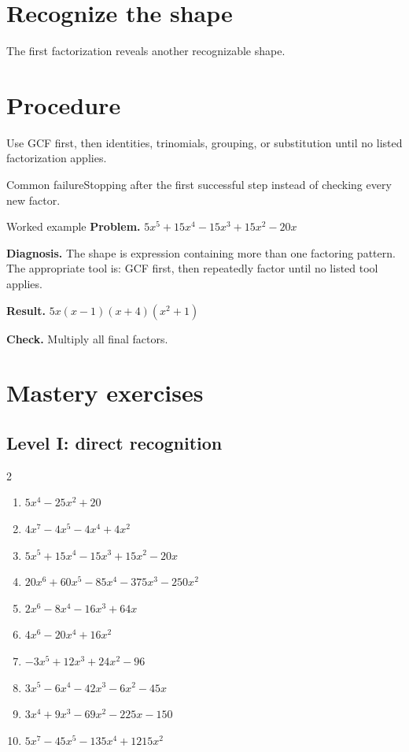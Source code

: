\documentclass[11pt,oneside]{book}
\begin{document}
\section{Recognize the shape}
The first factorization reveals another recognizable shape.
\section{Procedure}
Use GCF first, then identities, trinomials, grouping, or substitution until no listed factorization applies.

\begin{warningbox}{Common failure}Stopping after the first successful step instead of checking every new factor.\end{warningbox}
\begin{examplebox}{Worked example}
\textbf{Problem.} $ 5 x^{5} + 15 x^{4} - 15 x^{3} + 15 x^{2} - 20 x $

\textbf{Diagnosis.} The shape is expression containing more than one factoring pattern. The appropriate tool is: GCF first, then repeatedly factor until no listed tool applies.

\textbf{Result.} $ 5 x \left(x - 1\right) \left(x + 4\right) \left(x^{2} + 1\right) $

\textbf{Check.} Multiply all final factors.
\end{examplebox}
\section{Mastery exercises}
\subsection*{Level I: direct recognition}
\begin{multicols}{2}
\begin{enumerate}[leftmargin=*,label=\textbf{\arabic*.},itemsep=0.65\baselineskip]
\item $ 5 x^{4} - 25 x^{2} + 20 $
\item $ 4 x^{7} - 4 x^{5} - 4 x^{4} + 4 x^{2} $
\item $ 5 x^{5} + 15 x^{4} - 15 x^{3} + 15 x^{2} - 20 x $
\item $ 20 x^{6} + 60 x^{5} - 85 x^{4} - 375 x^{3} - 250 x^{2} $
\item $ 2 x^{6} - 8 x^{4} - 16 x^{3} + 64 x $
\item $ 4 x^{6} - 20 x^{4} + 16 x^{2} $
\item $ - 3 x^{5} + 12 x^{3} + 24 x^{2} - 96 $
\item $ 3 x^{5} - 6 x^{4} - 42 x^{3} - 6 x^{2} - 45 x $
\item $ 3 x^{4} + 9 x^{3} - 69 x^{2} - 225 x - 150 $
\item $ 5 x^{7} - 45 x^{5} - 135 x^{4} + 1215 x^{2} $
\end{enumerate}
\end{multicols}
\end{document}
